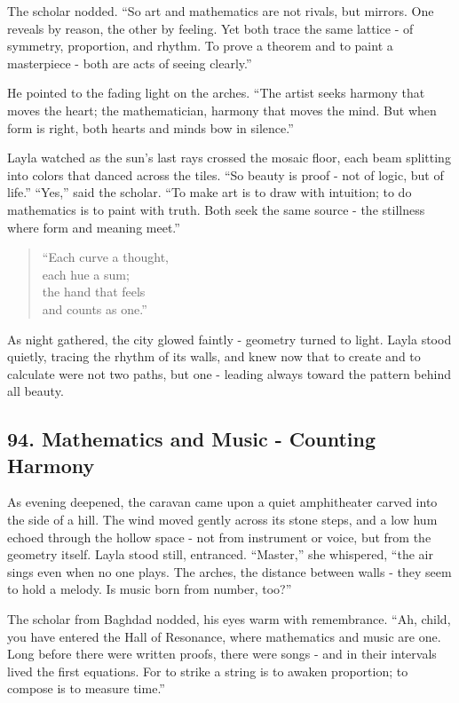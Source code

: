 \documentclass[
  letterpaper,
  DIV=11,
  numbers=noendperiod]{scrreprt}
\begin{document}
The scholar nodded. ``So art and mathematics are not rivals, but
mirrors. One reveals by reason, the other by feeling. Yet both trace the
same lattice - of symmetry, proportion, and rhythm. To prove a theorem
and to paint a masterpiece - both are acts of seeing clearly.''

He pointed to the fading light on the arches. ``The artist seeks harmony
that moves the heart; the mathematician, harmony that moves the mind.
But when form is right, both hearts and minds bow in silence.''

Layla watched as the sun's last rays crossed the mosaic floor, each beam
splitting into colors that danced across the tiles. ``So beauty is proof
- not of logic, but of life.'' ``Yes,'' said the scholar. ``To make art
is to draw with intuition; to do mathematics is to paint with truth.
Both seek the same source - the stillness where form and meaning meet.''

\begin{quote}
``Each curve a thought,\\
each hue a sum;\\
the hand that feels\\
and counts as one.''
\end{quote}

As night gathered, the city glowed faintly - geometry turned to light.
Layla stood quietly, tracing the rhythm of its walls, and knew now that
to create and to calculate were not two paths, but one - leading always
toward the pattern behind all beauty.

\subsection{94. Mathematics and Music - Counting
Harmony}\label{mathematics-and-music---counting-harmony}

As evening deepened, the caravan came upon a quiet amphitheater carved
into the side of a hill. The wind moved gently across its stone steps,
and a low hum echoed through the hollow space - not from instrument or
voice, but from the geometry itself. Layla stood still, entranced.
``Master,'' she whispered, ``the air sings even when no one plays. The
arches, the distance between walls - they seem to hold a melody. Is
music born from number, too?''

The scholar from Baghdad nodded, his eyes warm with remembrance. ``Ah,
child, you have entered the Hall of Resonance, where mathematics and
music are one. Long before there were written proofs, there were songs -
and in their intervals lived the first equations. For to strike a string
is to awaken proportion; to compose is to measure time.''
\end{document}
